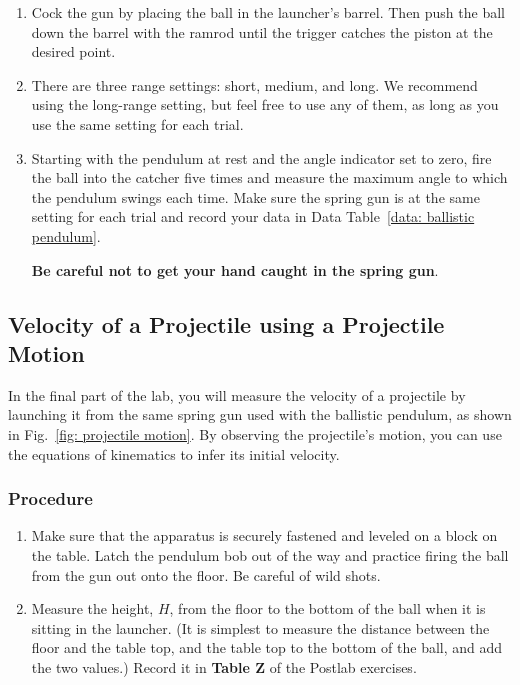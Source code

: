 \documentclass[addpoints]{physlabs}
\begin{document}
\begin{labsection}
\begin{experiment}
\begin{enumerate}
        \item Cock the gun by placing the ball in the launcher’s barrel. Then push the ball down the barrel with the ramrod until the trigger catches the piston at the desired point.
        
        \item There are three range settings: short, medium, and long. We recommend using the long-range setting, but feel free to use any of them, as long as you use the same setting for each trial.

        \item Starting with the pendulum at rest and the angle indicator set to zero, fire the ball into the catcher five times and measure the maximum angle to which the pendulum
        swings each time. Make sure the spring gun is at the same setting for each trial and record your data in Data Table~\ref{data: ballistic pendulum}.
        
        \textbf{Be careful not to get your hand caught in the spring gun}.
    \end{enumerate}

    \subsection*{Velocity of a Projectile using a Projectile Motion}

    In the final part of the lab, you will measure the velocity of a projectile by launching it from the same spring gun used with the ballistic pendulum, as shown in Fig.~\ref{fig: projectile motion}. By observing the projectile's motion, you can use the equations of kinematics to infer its initial velocity.

    \subsubsection*{Procedure}

    \begin{enumerate}
        \item Make sure that the apparatus is securely fastened and leveled on a block on the table. Latch the pendulum bob out of the way and practice firing the ball from the gun out onto the floor. Be careful of wild shots.

        \item Measure the height, $H$, from the floor to the bottom of the ball when it is sitting in the launcher. (It is simplest to measure the distance between the floor and the table top, and the table top to the bottom of the ball, and add the two values.) Record it in \textbf{Table Z} of the Postlab exercises.


\end{enumerate}
\end{experiment}
\end{labsection}
\end{document}
